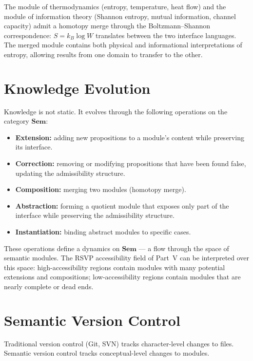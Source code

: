 \begin{example}
  The module of thermodynamics (entropy, temperature, heat flow) and
  the module of information theory (Shannon entropy, mutual information,
  channel capacity) admit a homotopy merge through the Boltzmann–Shannon
  correspondence: $S = k_B \log W$ translates between the two interface
  languages. The merged module contains both physical and informational
  interpretations of entropy, allowing results from one domain to
  transfer to the other.
\end{example}

\section{Knowledge Evolution}

Knowledge is not static. It evolves through the following operations
on the category $\mathbf{Sem}$:

\begin{itemize}
  \item \textbf{Extension:} adding new propositions to a module's content
        while preserving its interface.
  \item \textbf{Correction:} removing or modifying propositions that have
        been found false, updating the admissibility structure.
  \item \textbf{Composition:} merging two modules (homotopy merge).
  \item \textbf{Abstraction:} forming a quotient module that exposes
        only part of the interface while preserving the admissibility
        structure.
  \item \textbf{Instantiation:} binding abstract modules to specific cases.
\end{itemize}

These operations define a dynamics on $\mathbf{Sem}$ — a flow through
the space of semantic modules. The RSVP accessibility field of
Part~V can be interpreted over this space: high-accessibility regions
contain modules with many potential extensions and compositions;
low-accessibility regions contain modules that are nearly complete
or dead ends.

\section{Semantic Version Control}

Traditional version control (Git, SVN) tracks character-level changes to
files. Semantic version control tracks conceptual-level changes to modules.

